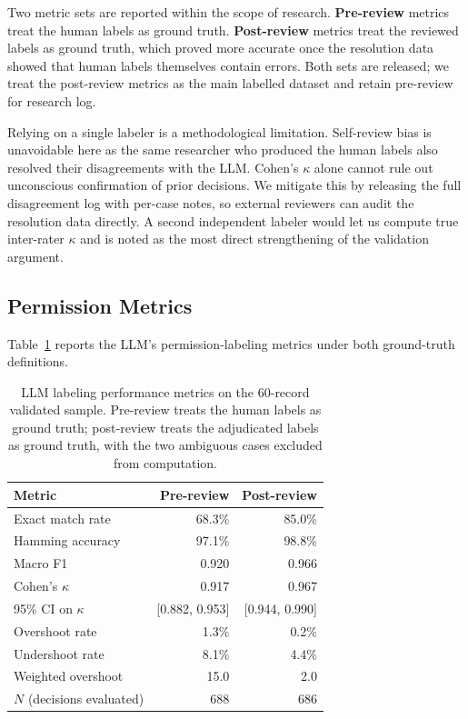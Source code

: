 \documentclass{article}
\theoremstyle{plain}
\theoremstyle{definition}
\theoremstyle{remark}
\begin{document}
Two metric sets are reported within the scope of research. \textbf{Pre-review} 
metrics treat the human labels as ground truth. \textbf{Post-review} 
metrics treat the reviewed labels as ground truth, which proved more accurate once the resolution data showed that human labels 
themselves contain errors. Both sets are released; we treat the 
post-review metrics as the main labelled dataset and retain pre-review for research log.

Relying on a single labeler is a methodological limitation. Self-review bias is unavoidable here as the same 
researcher who produced the human labels also resolved their 
disagreements with the LLM. Cohen's $\kappa$ alone cannot rule out 
unconscious confirmation of prior decisions. We mitigate this by 
releasing the full disagreement log with per-case notes, so external 
reviewers can audit the resolution data directly. A second independent 
labeler would let us compute true inter-rater $\kappa$ and is noted 
as the most direct strengthening of the validation argument.

\subsection{Permission Metrics}
Table~\ref{tab:pre-post-metrics} reports the LLM's permission-labeling metrics 
under both ground-truth definitions.

\begin{table}[htbp]
\centering
\begin{tabular}{lrr}
\toprule
\textbf{Metric} & \textbf{Pre-review} & \textbf{Post-review} \\
\midrule
Exact match rate & 68.3\% & 85.0\% \\
Hamming accuracy & 97.1\% & 98.8\% \\
Macro F1 & 0.920 & 0.966 \\
Cohen's $\kappa$ & 0.917 & 0.967 \\
95\% CI on $\kappa$ & [0.882, 0.953] & [0.944, 0.990] \\
Overshoot rate & 1.3\% & 0.2\% \\
Undershoot rate & 8.1\% & 4.4\% \\
Weighted overshoot & 15.0 & 2.0 \\
$N$ (decisions evaluated) & 688 & 686 \\
\bottomrule
\end{tabular}
\caption{LLM labeling performance metrics on the 60-record validated 
sample. Pre-review treats the human labels as ground truth; 
post-review treats the adjudicated labels as ground truth, with the 
two ambiguous cases excluded from computation.}
\label{tab:pre-post-metrics}
\end{table}
\end{document}
